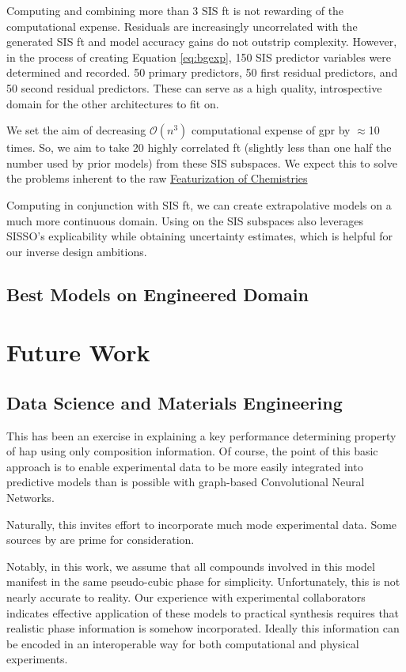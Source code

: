 \documentclass[aip, jmp, amsmath, amssymb, nofootinbib]{revtex4-2}
\begin{document}
Computing and combining more than 3 SIS \gls{ft} is not rewarding of
the computational expense. Residuals are increasingly uncorrelated
with the generated SIS \gls{ft} and model accuracy gains do not
outstrip complexity. However, in the process of creating Equation
\ref{eq:bgexp}, 150 SIS predictor variables were determined and
recorded. 50 primary predictors, 50 first residual predictors, and 50
second residual predictors. These can serve as a high quality,
introspective domain for the other architectures to fit on.

We set the aim of decreasing \(\mathcal{O}(n^3)\) computational
expense of \acrshort{gpr} by \(\approx\)10 times. So, we aim to take 20 highly
correlated \gls{ft} (slightly less than one half the number used by
prior models) from these SIS subspaces. We expect this to solve the
problems inherent to the raw \hyperref[sec:org20ef658]{Featurization of Chemistries}

Computing  in conjunction with SIS \gls{ft}, we can create
extrapolative models on a much more continuous domain. Using  on
the SIS subspaces also leverages SISSO's explicability while obtaining
uncertainty estimates, which is helpful for our inverse design
ambitions.

\subsection*{Best Models on Engineered Domain}
\label{sec:org434f08d}
\section*{Future Work}
\label{sec:orgda576cc}
\subsection*{Data Science and Materials Engineering}
\label{sec:org8e190e1}
This has been an exercise in explaining a key performance determining
property of \Acrfull{hap} using only composition
information. Of course, the point of this basic approach is to enable
experimental data to be more easily integrated into predictive models
than is possible with graph-based Convolutional Neural Networks.

Naturally, this invites effort to incorporate much mode experimental
data. Some sources by
\citet{jacobsson-2021-open-acces,briones-2021-accel-lattic} are prime
for consideration.

Notably, in this work, we assume that all compounds involved in this
model manifest in the same pseudo-cubic phase for
simplicity. Unfortunately, this is not nearly accurate to reality. Our
experience with experimental collaborators indicates effective
application of these models to practical synthesis requires that
realistic phase information is somehow incorporated. Ideally this
information can be encoded in an interoperable way for both
computational and physical experiments.
\end{document}
